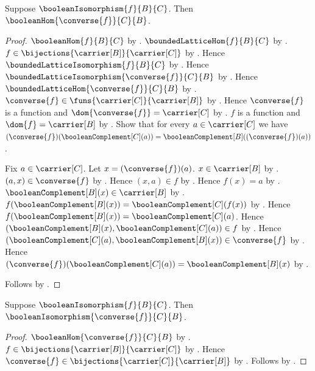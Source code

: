 \begin{theorem}\label{boolean_isomorphism_converse_hom}
    Suppose $\booleanIsomorphism{f}{B}{C}$.
    Then $\booleanHom{\converse{f}}{C}{B}$.
\end{theorem}
\begin{proof}
    $\booleanHom{f}{B}{C}$ by
        .
    $\boundedLatticeHom{f}{B}{C}$ by
        .
    $f\in\bijections{\carrier[B]}{\carrier[C]}$ by
        .
    Hence $\boundedLatticeIsomorphism{f}{B}{C}$ by
        .
    Hence $\boundedLatticeIsomorphism{\converse{f}}{C}{B}$ by
        .
    Hence $\boundedLatticeHom{\converse{f}}{C}{B}$ by
        .
    $\converse{f}\in\funs{\carrier[C]}{\carrier[B]}$ by
        .
    Hence $\converse{f}$ is a function and
        $\dom{\converse{f}}=\carrier[C]$ by
        .
    $f$ is a function and $\dom{f}=\carrier[B]$ by
        .
    Show that for every $a\in\carrier[C]$ we have
        $(\converse{f})(\booleanComplement[C](a))
            =\booleanComplement[B]((\converse{f})(a))$.
    \begin{subproof}
        Fix $a\in\carrier[C]$.
        Let $x=(\converse{f})(a)$.
        $x\in\carrier[B]$ by .
        $(a,x)\in\converse{f}$ by
            .
        Hence $(x,a)\in f$ by .
        Hence $f(x)=a$ by .
        $\booleanComplement[B](x)\in\carrier[B]$ by
            .
        $f(\booleanComplement[B](x))
            =\booleanComplement[C](f(x))$ by
            .
        Hence $f(\booleanComplement[B](x))
            =\booleanComplement[C](a)$.
        Hence $(\booleanComplement[B](x),
            \booleanComplement[C](a))\in f$ by
            .
        Hence $(\booleanComplement[C](a),
            \booleanComplement[B](x))\in\converse{f}$ by
            .
        Hence $(\converse{f})(\booleanComplement[C](a))
            =\booleanComplement[B](x)$ by
            .
    \end{subproof}
    Follows by .
\end{proof}

\begin{theorem}\label{boolean_isomorphism_converse}
    Suppose $\booleanIsomorphism{f}{B}{C}$.
    Then $\booleanIsomorphism{\converse{f}}{C}{B}$.
\end{theorem}
\begin{proof}
    $\booleanHom{\converse{f}}{C}{B}$ by
        .
    $f\in\bijections{\carrier[B]}{\carrier[C]}$ by
        .
    Hence $\converse{f}\in
        \bijections{\carrier[C]}{\carrier[B]}$ by
        .
    Follows by .
\end{proof}

